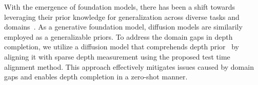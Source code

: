 With the emergence of foundation models, there has been a shift towards leveraging their prior knowledge for generalization across diverse tasks and domains~\cite{ jia2023dginstyle, liu2023grounding}.
As a generative foundation model, diffusion models are similarily employed as a generalizable priors.
To address the domain gaps in depth completion, we utilize a diffusion model that comprehends depth prior~\cite{ke2023repurposing, gui2024depthfm} by aligning it with sparse depth measurement 
using the proposed test time alignment method.
This approach effectively mitigates issues caused by domain gaps and enables depth completion in a zero-shot manner.


